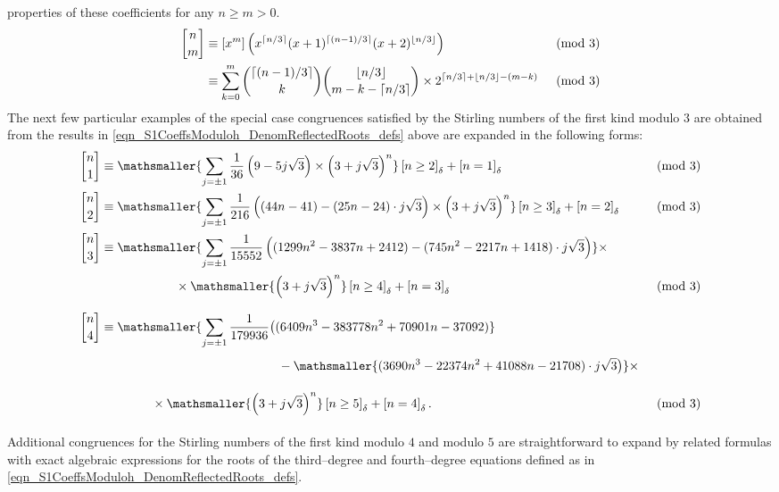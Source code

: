 \documentclass[12pt,reqno]{article}
\numberwithin{sfootnote}{section}
\numberwithin{equation}{section}
\theoremstyle{plain}
\theoremstyle{definition}
\theoremstyle{remark}
\newcommand{\gkpSI}[2]{\ensuremath{\genfrac{\lbrack}{\rbrack}{0pt}{}{#1}{#2}}}
\newcommand{\Iverson}[1]{\ensuremath{\left[#1\right]_{\delta}}}
\begin{document}
properties of these coefficients for any $n \geq m > 0$. 
\begin{align*} 
\gkpSI{n}{m} & \equiv 
     [x^m] \left( 
     x^{\lceil n/3 \rceil} (x+1)^{\lceil (n-1)/3 \rceil} 
     (x+2)^{\lfloor n/3 \rfloor} 
     \right) && \pmod{3} \\ 
     & \equiv 
     \sum_{k=0}^{m} \binom{\lceil (n-1)/3 \rceil}{k} 
     \binom{\lfloor n/3 \rfloor}{m-k - \lceil n/3 \rceil} \times 
     2^{\lceil n/3 \rceil + \lfloor n/3 \rfloor -(m-k)} && \pmod{3} 
\end{align*} 
The next few particular examples of the 
special case congruences 
satisfied by the Stirling numbers of the first kind modulo $3$ 
are obtained from the results in 
\eqref{eqn_S1CoeffsModuloh_DenomReflectedRoots_defs} 
above are expanded in the following forms: 
\begin{align*} 
\gkpSI{n}{1} & \equiv 
     \mathsmaller{ 
     \sum\limits_{j = \pm 1} 
     \frac{1}{36} \left(9-5 j\sqrt{3}\right) 
     \times \left(3+j\sqrt{3}\right)^{n} 
     } 
     \Iverson{n \geq 2} + \Iverson{n = 1} && \pmod{3} \\ 
\gkpSI{n}{2} & \equiv 
     \mathsmaller{ 
     \sum\limits_{j = \pm 1} 
     \frac{1}{216} \left((44n-41)-(25n-24) \cdot j\sqrt{3}\right) 
     \times \left(3+j\sqrt{3}\right)^{n} 
     } 
     \Iverson{n \geq 3} + \Iverson{n = 2} && \pmod{3} \\ 
\gkpSI{n}{3} & \equiv 
     \mathsmaller{ 
     \sum\limits_{j = \pm 1} 
     \frac{1}{15552} \left((1299n^2-3837n+2412)- 
     (745n^2-2217n+1418) \cdot j\sqrt{3}\right) 
     } \times && \\ 
     & \phantom{\equiv \sum\limits_{j = \pm 1} \frac{1}{15552}} \times 
     \mathsmaller{ 
     \left(3+j\sqrt{3}\right)^{n} 
     } 
     \Iverson{n \geq 4} + \Iverson{n = 3} && \pmod{3} \\ 
\gkpSI{n}{4} & \equiv 
     \mathsmaller{ 
     \sum\limits_{j = \pm 1} 
     \frac{1}{179936} \bigl((6409n^3-383778n^2+70901n-37092) 
     } && \\ 
     & \phantom{\equiv\mathsmaller{\sum\limits_{j=\pm 1} 
                \frac{1}{179936}}\bigl(} - 
     \mathsmaller{ 
     (3690n^3-22374n^2+41088n-21708) \cdot j\sqrt{3}\bigr) 
     } \times && \\ 
     & \phantom{\equiv \sum\limits_{j = \pm 1} \quad } \times 
     \mathsmaller{ 
     \left(3+j\sqrt{3}\right)^{n} 
     } 
     \Iverson{n \geq 5} + \Iverson{n = 4}. && \pmod{3} 
\end{align*} 
Additional congruences for the Stirling numbers of the first kind 
modulo $4$ and modulo $5$ are straightforward to expand by 
related formulas with exact 
algebraic expressions for the roots of the third--degree and 
fourth--degree equations defined as in 
\eqref{eqn_S1CoeffsModuloh_DenomReflectedRoots_defs}. 
\end{document}
